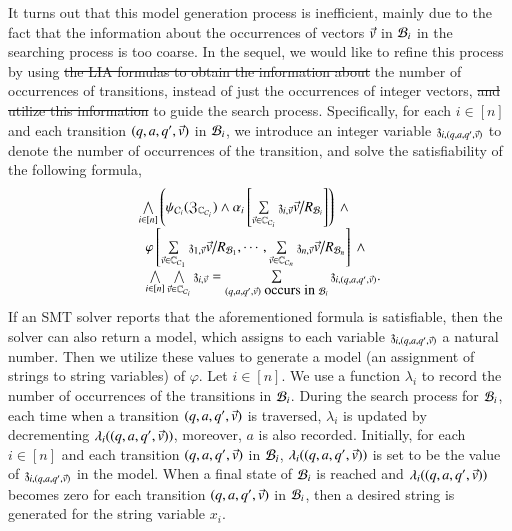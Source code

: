It turns out that this model generation process is inefficient, mainly due to the fact that the information about the occurrences of vectors $\vec{v}$ in $\mathcal{B}_i$ in the searching process is too coarse. In the sequel, we would like to refine this process by using \sout{the LIA formulas to obtain the information about} the number of occurrences of transitions, instead of just the occurrences of integer vectors, \sout{and utilize this information} to guide the search process. 
Specifically, for each $i \in [n]$ and each transition $(q, a, q', \vec{v})$ in $\mathcal{B}_i$, we introduce an integer variable $\mathfrak{z}_{i, (q, a, q', \vec{v})}$ to denote the number of occurrences of the transition, and solve the satisfiability of the following formula,  
\[
\begin{array}{l}
\bigwedge \limits_{i \in [n]} \left(\psi_{\cC_i}(\fZ_{\costset_{\cC_i}}) \wedge \alpha_i\left[\sum\limits_{\myvec{v} \in \costset_{\cC_i}} \anivarz_{i, \myvec{v}} \myvec{v} \big{/}R_{\cB_i}  \right] \right) \ \wedge \\
\ \ \varphi \left[ \sum\limits_{\myvec{v} \in \costset_{\cC_1}} \anivarz_{1, \myvec{v}} \myvec{v} \big{/}R_{\cB_1}, \cdots, \sum\limits_{\myvec{v} \in \costset_{\cC_n}} \anivarz_{n, \myvec{v}} \myvec{v} \big{/}R_{\cB_n} \right]\ \wedge \\
\ \ \bigwedge \limits_{i \in [n]} \bigwedge \limits_{\myvec{v} \in \costset_{\cC_i}} \anivarz_{i, \myvec{v}} = \sum \limits_{(q, a, q', \myvec{v}) \mbox{ occurs in } \cB_i} \anivarz_{i, (q, a, q', \myvec{v})}.
\end{array}
\]
If an SMT solver reports that the aforementioned formula is satisfiable, then the solver can also return a model, which assigns to each variable $\mathfrak{z}_{i, (q, a, q', \vec{v})}$ a natural number. 
Then we utilize these values to generate a model (an assignment of strings to string variables) of $\varphi$. 
Let $i \in [n]$. We use a function $\lambda_i$ to record the number of occurrences of the transitions in $\mathcal{B}_i$. During the search process for $\mathcal{B}_i$, each time when a transition $(q, a, q', \vec{v})$ is traversed, $\lambda_i$ is updated by decrementing $\lambda_i((q, a, q', \vec{v}))$, moreover, $a$ is also recorded. Initially, for each $i \in [n]$ and each transition $(q, a, q', \vec{v})$ in $\mathcal{B}_i$, $\lambda_i((q, a, q', \vec{v}))$ is set to be the value of $\mathfrak{z}_{i, (q, a, q', \vec{v})}$ in the model. When a final state of $\mathcal{B}_i$ is reached and $\lambda_i((q, a, q', \vec{v}))$ becomes zero for each transition $(q, a, q', \vec{v})$ in $\mathcal{B}_i$, then a desired string is generated for the string variable $x_i$. 

